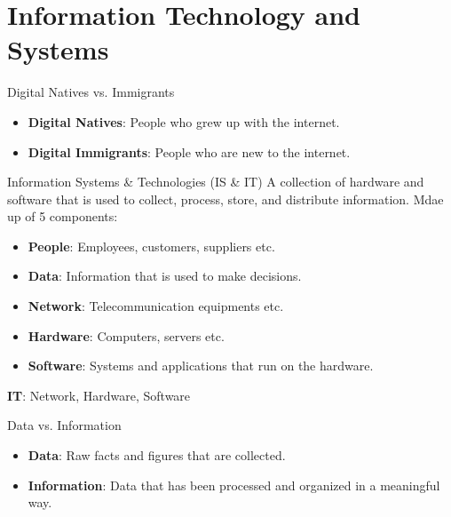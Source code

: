
\section{Information Technology and Systems}

\begin{definition}
    {Digital Natives vs. Immigrants}
    \begin{itemize}
        \item \textbf{Digital Natives}: People who grew up with the internet.
        \item \textbf{Digital Immigrants}: People who are new to the internet.
    \end{itemize}
\end{definition}

\begin{definition}
    {Information Systems \& Technologies (IS \& IT)}
    A collection of hardware and software that is used to collect, process, store, and distribute information.
    Mdae up of 5 components:
    \begin{itemize}
        \item \textbf{People}: Employees, customers, suppliers etc.
        \item \textbf{Data}: Information that is used to make decisions.
        \item \textbf{Network}: Telecommunication equipments etc.
        \item \textbf{Hardware}: Computers, servers etc.
        \item \textbf{Software}: Systems and applications that run on the hardware.
    \end{itemize}
    \textbf{IT}: Network, Hardware, Software
\end{definition}

\begin{definition}
    {Data vs. Information}
    \begin{itemize}
        \item \textbf{Data}: Raw facts and figures that are collected.
        \item \textbf{Information}: Data that has been processed and organized in a meaningful way.
    \end{itemize}
\end{definition}